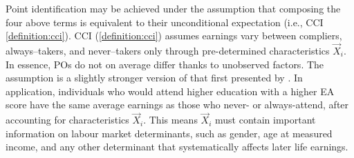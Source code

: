 Point identification may be achieved under the assumption that composing the four above terms is equivalent to their unconditional expectation (i.e., CCI \ref{definition:cci}).
CCI (\ref{definition:cci}) assumes earnings vary between compliers, always--takers, and never--takers only through pre-determined characteristics $\vec X_i$.
In essence, POs do not on average differ thanks to unobserved factors.
The assumption is a slightly stronger version of that first presented by \citet[Assumption~3]{angrist2010extrapolate}.
In application, individuals who would attend higher education with a higher EA score have the same average earnings as those who never- or always-attend, after accounting for characteristics $\vec X_i$.
This means $\vec X_i$ must contain important information on labour market determinants, such as gender, age at measured income, and any other determinant that systematically affects later life earnings.

